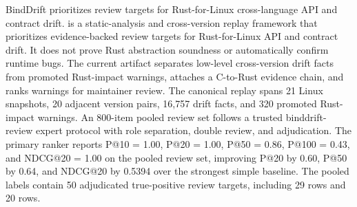 BindDrift prioritizes review targets for Rust-for-Linux cross-language API and
contract drift. \tool{} is a static-analysis and cross-version replay framework
that prioritizes evidence-backed review targets for Rust-for-Linux API and
contract drift. It does not prove Rust abstraction soundness or automatically
confirm runtime bugs. The current artifact separates low-level cross-version
drift facts from promoted Rust-impact warnings, attaches a C-to-Rust evidence
chain, and ranks warnings for maintainer review. The canonical replay spans 21
Linux snapshots, 20 adjacent version pairs, 16,757 drift facts, and 320
promoted Rust-impact warnings. An 800-item pooled review set follows a trusted
binddrift-review expert protocol with role separation, double review, and
adjudication. The primary
\primary{} ranker reports P@10 = 1.00, P@20 = 1.00, P@50 = 0.86, P@100 = 0.43,
and NDCG@20 = 1.00 on the pooled review set, improving P@20 by 0.60, P@50 by
0.64, and NDCG@20 by 0.5394 over the strongest simple baseline. The pooled
labels contain 50 adjudicated true-positive review targets, including 29
\truesemantic{} rows and 20 \truewrapper{} rows.
